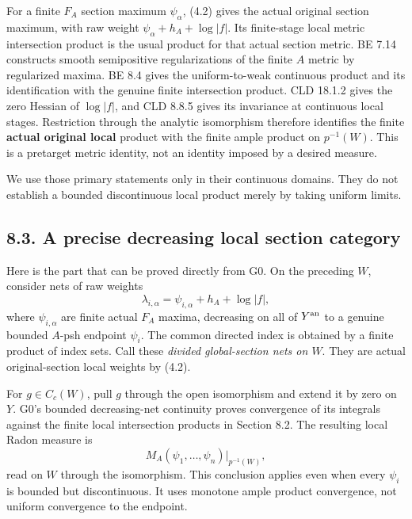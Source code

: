 \documentclass[
  10pt,
]{article}
\begin{document}
For a finite \(F_A\) section maximum \(\psi_\alpha\), (4.2) gives the
actual original section maximum, with raw weight
\(\psi_\alpha+h_A+\log|f|\). Its finite-stage local metric intersection
product is the usual product for that actual section metric. BE 7.14
constructs smooth semipositive regularizations of the finite \(A\)
metric by regularized maxima. BE 8.4 gives the uniform-to-weak
continuous product and its identification with the genuine finite
intersection product. CLD 18.1.2 gives the zero Hessian of \(\log|f|\),
and CLD 8.8.5 gives its invariance at continuous local stages.
Restriction through the analytic isomorphism therefore identifies the
finite \textbf{actual original local} product with the finite ample
product on \(p^{-1}(W)\). This is a pretarget metric identity, not an
identity imposed by a desired measure.

We use those primary statements only in their continuous domains. They
do not establish a bounded discontinuous local product merely by taking
uniform limits.

\subsection{8.3. A precise decreasing local section
category}\label{a-precise-decreasing-local-section-category}

Here is the part that can be proved directly from G0. On the preceding
\(W\), consider nets of raw weights
\[\lambda_{i,\alpha}=\psi_{i,\alpha}+h_A+\log|f|,\] where
\(\psi_{i,\alpha}\) are finite actual \(F_A\) maxima, decreasing on all
of \(Y^{\rm an}\) to a genuine bounded \(A\)-psh endpoint \(\psi_i\).
The common directed index is obtained by a finite product of index sets.
Call these \emph{divided global-section nets on \(W\)}. They are actual
original-section local weights by (4.2).

For \(g\in C_c(W)\), pull \(g\) through the open isomorphism and extend
it by zero on \(Y\). G0's bounded decreasing-net continuity proves
convergence of its integrals against the finite local intersection
products in Section 8.2. The resulting local Radon measure is
\[M_A(\psi_1,\ldots,\psi_n)|_{p^{-1}(W)},                \tag{8.4}\]
read on \(W\) through the isomorphism. This conclusion applies even when
every \(\psi_i\) is bounded but discontinuous. It uses monotone ample
product convergence, not uniform convergence to the endpoint.
\end{document}

